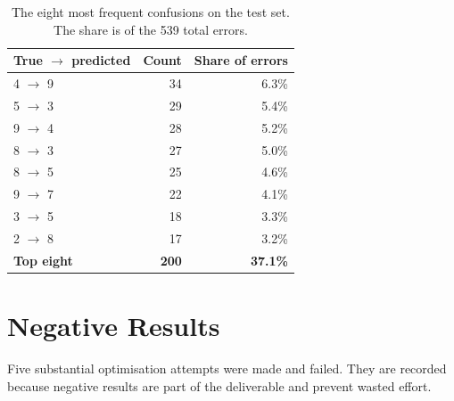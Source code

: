 \documentclass[11pt,a4paper]{article}
\begin{document}
\begin{table}[H]
\centering
\small
\caption{The eight most frequent confusions on the test set. The share is of the
  539 total errors.}
\label{tab:confusions}
\begin{tabular}{@{}lrr@{}}
\toprule
\textbf{True $\rightarrow$ predicted} & \textbf{Count} & \textbf{Share of errors} \\
\midrule
4 $\rightarrow$ 9 & 34 & 6.3\% \\
5 $\rightarrow$ 3 & 29 & 5.4\% \\
9 $\rightarrow$ 4 & 28 & 5.2\% \\
8 $\rightarrow$ 3 & 27 & 5.0\% \\
8 $\rightarrow$ 5 & 25 & 4.6\% \\
9 $\rightarrow$ 7 & 22 & 4.1\% \\
3 $\rightarrow$ 5 & 18 & 3.3\% \\
2 $\rightarrow$ 8 & 17 & 3.2\% \\
\midrule
\textbf{Top eight} & \textbf{200} & \textbf{37.1\%} \\
\bottomrule
\end{tabular}
\end{table}

\section{Negative Results}
\label{sec:negative}

Five substantial optimisation attempts were made and failed. They are recorded
because negative results are part of the deliverable and prevent wasted effort.
\end{document}
